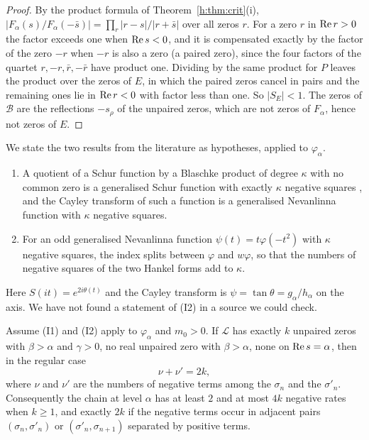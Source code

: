 \begin{proof}
By the product formula of Theorem~\ref{h:thm:crit}(i), $|F_\alpha(s)/F_\alpha(-\bar s)|=\prod_r|r-s|/|r+\bar s|$ over all zeros $r$. For a zero $r$ in $\operatorname{Re} r>0$ the factor exceeds one when $\operatorname{Re} s<0$, and it is compensated exactly by the factor of the zero $-r$ when $-r$ is also a zero (a paired zero), since the four factors of the quartet $r,-r,\bar r,-\bar r$ have product one. Dividing by the same product for $P$ leaves the product over the zeros of $E$, in which the paired zeros cancel in pairs and the remaining ones lie in $\operatorname{Re} r<0$ with factor less than one. So $|S_E|<1$. The zeros of $\mathcal B$ are the reflections $-s_\rho$ of the unpaired zeros, which are not zeros of $F_\alpha$, hence not zeros of $E$.
\end{proof}

We state the two results from the literature as hypotheses, applied to $\varphi_\alpha$.
\begin{enumerate}
\item[(I1)] A quotient of a Schur function by a Blaschke product of degree $\kappa$ with no common zero is a generalised Schur function with exactly $\kappa$ negative squares \cite{KL77}, and the Cayley transform of such a function is a generalised Nevanlinna function with $\kappa$ negative squares.
\item[(I2)] For an odd generalised Nevanlinna function $\psi(t)=t\varphi(-t^2)$ with $\kappa$ negative squares, the index splits between $\varphi$ and $w\varphi$, so that the numbers of negative squares of the two Hankel forms add to $\kappa$.
\end{enumerate}
Here $S(it)=e^{2i\theta(t)}$ and the Cayley transform is $\psi=\tan\theta=g_\alpha/h_\alpha$ on the axis. We have not found a statement of (I2) in a source we could check.

\begin{theorem}[Inertia]\label{h:thm:inertia}
Assume (I1) and (I2) apply to $\varphi_\alpha$ and $m_0>0$. If $\mathcal L$ has exactly $k$ unpaired zeros with $\beta>\alpha$ and $\gamma>0$, no real unpaired zero with $\beta>\alpha$, none on $\operatorname{Re} s=\alpha$, then in the regular case
\[
\nu+\nu'=2k,
\]
where $\nu$ and $\nu'$ are the numbers of negative terms among the $\sigma_n$ and the $\sigma'_n$. Consequently the chain at level $\alpha$ has at least $2$ and at most $4k$ negative rates when $k\ge1$, and exactly $2k$ if the negative terms occur in adjacent pairs $(\sigma_n,\sigma'_n)$ or $(\sigma'_n,\sigma_{n+1})$ separated by positive terms.
\end{theorem}

